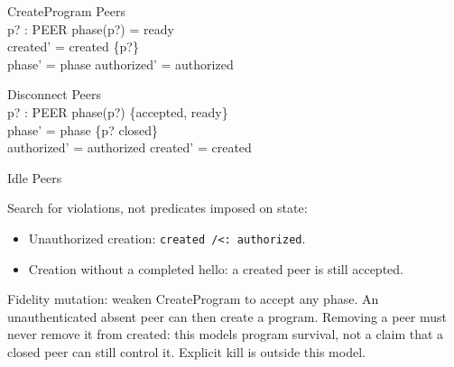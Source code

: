 \documentclass[a4paper,10pt]{article}
\begin{document}
\begin{schema}{CreateProgram}
\Delta Peers \\
p? : PEER
\where
phase(p?) = ready \\
created' = created \cup \{p?\} \\
phase' = phase \land authorized' = authorized
\end{schema}
\begin{schema}{Disconnect}
\Delta Peers \\
p? : PEER
\where
phase(p?) \in \{accepted, ready\} \\
phase' = phase \oplus \{p? \mapsto closed\} \\
authorized' = authorized \land created' = created
\end{schema}
\begin{schema}{Idle}
\Xi Peers
\end{schema}

Search for violations, not predicates imposed on state:
\begin{itemize}
\item Unauthorized creation: \texttt{created /<: authorized}.
\item Creation without a completed hello: a created peer is still accepted.
\end{itemize}
Fidelity mutation: weaken CreateProgram to accept any phase. An unauthenticated
absent peer can then create a program. Removing a peer must never remove it
from created: this models program survival, not a claim that a closed peer can
still control it. Explicit kill is outside this model.
\end{document}

